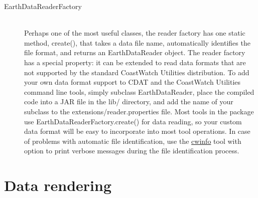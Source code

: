 \begin{description}
\item[{\java EarthDataReaderFactory}]~\\ Perhaps one of the most
useful classes, the reader factory has one static method, {\java
create()}, that takes a data file name, automatically identifies
the file format, and returns an {\java EarthDataReader} object.
The reader factory has a special property: it can be extended to
read data formats that are not supported by the standard
CoastWatch Utilities distribution.  To add your own data format
support to CDAT and the CoastWatch Utilities command line tools,
simply subclass {\java EarthDataReader}, place the compiled code
into a JAR file in the {\file lib/} directory, and add the name
of your subclass to the {\file extensions/reader.properties}
file.  Most tools in the package use {\java
EarthDataReaderFactory.create()} for data reading, so your custom
data format will be easy to incorporate into most tool
operations.  In case of problems with automatic file
identification, use the \hyperlink{cwinfo}{cwinfo} tool with
 option to print verbose messages during the file
identification process.

\end{description}

\section{Data rendering}


